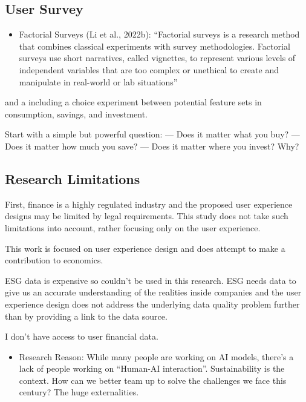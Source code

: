 \documentclass[
  letterpaper,
  DIV=11,
  numbers=noendperiod]{scrartcl}
\providecommand{\tightlist}{%
  \setlength{\itemsep}{0pt}\setlength{\parskip}{0pt}}\usepackage{longtable,booktabs,array}
\begin{document}
\subsection{User Survey}\label{user-survey}

\begin{itemize}
\tightlist
\item
  Factorial Surveys (Li et al., 2022b): ``Factorial surveys is a
  research method that combines classical experiments with survey
  methodologies. Factorial surveys use short narratives, called
  vignettes, to represent various levels of independent variables that
  are too complex or unethical to create and manipulate in real-world or
  lab situations''
\end{itemize}

and a including a choice experiment between potential feature sets in
consumption, savings, and investment.

Start with a simple but powerful question: --- Does it matter what you
buy? --- Does it matter how much you save? --- Does it matter where you
invest? Why?

\subsection{Research Limitations}\label{research-limitations}

First, finance is a highly regulated industry and the proposed user
experience designs may be limited by legal requirements. This study does
not take such limitations into account, rather focusing only on the user
experience.

This work is focused on user experience design and does attempt to make
a contribution to economics.

ESG data is expensive so couldn't be used in this research. ESG needs
data to give us an accurate understanding of the realities inside
companies and the user experience design does not address the underlying
data quality problem further than by providing a link to the data
source.

I don't have access to user financial data.

\begin{itemize}
\tightlist
\item
  Research Reason: While many people are working on AI models, there's a
  lack of people working on ``Human-AI interaction''. Sustainability is
  the context. How can we better team up to solve the challenges we face
  this century? The huge externalities.
\end{itemize}
\end{document}

